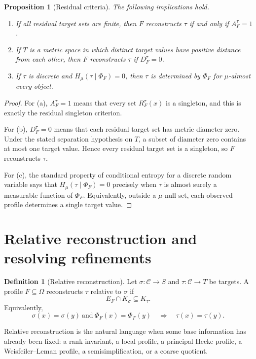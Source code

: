 \documentclass[11pt]{article}
\newtheorem{proposition}[theorem]{Proposition}
\theoremstyle{definition}
\newtheorem{definition}[theorem]{Definition}
\theoremstyle{remark}
\begin{document}
\begin{proposition}[Residual criteria]
The following implications hold.
\begin{enumerate}[label=(\alph*)]
\item If all residual target sets are finite, then \(F\) reconstructs \(\tau\) if and only if \(A_F^\tau=1\).
\item If \(T\) is a metric space in which distinct target values have positive distance from each other, then \(F\) reconstructs \(\tau\) if \(D_F^\tau=0\).
\item If \(\tau\) is discrete and \(H_\mu(\tau\mid\Phi_F)=0\), then \(\tau\) is determined by \(\Phi_F\) for \(\mu\)-almost every object.
\end{enumerate}
\end{proposition}

\begin{proof}
For (a), \(A_F^\tau=1\) means that every set \(R_F^\tau(x)\) is a singleton, and this is exactly the residual singleton criterion.

For (b), \(D_F^\tau=0\) means that each residual target set has metric diameter zero.  Under the stated separation hypothesis on \(T\), a subset of diameter zero contains at most one target value.  Hence every residual target set is a singleton, so \(F\) reconstructs \(\tau\).

For (c), the standard property of conditional entropy for a discrete random variable says that \(H_\mu(\tau\mid\Phi_F)=0\) precisely when \(\tau\) is almost surely a measurable function of \(\Phi_F\).  Equivalently, outside a \(\mu\)-null set, each observed profile determines a single target value.
\end{proof}

\section{Relative reconstruction and resolving refinements}

\begin{definition}[Relative reconstruction]
Let \(\sigma:\mathcal C\to S\) and \(\tau:\mathcal C\to T\) be targets.  A profile \(F\subseteq\Omega\) reconstructs \(\tau\) relative to \(\sigma\) if
\[
E_F\cap K_\sigma\subseteq K_\tau.
\]
Equivalently,
\[
\sigma(x)=\sigma(y)\ \text{and}\ \Phi_F(x)=\Phi_F(y)
\quad\Longrightarrow\quad
\tau(x)=\tau(y).
\]
\end{definition}

Relative reconstruction is the natural language when some base information has already been fixed: a rank invariant, a local profile, a principal Hecke profile, a Weisfeiler--Leman profile, a semisimplification, or a coarse quotient.
\end{document}
